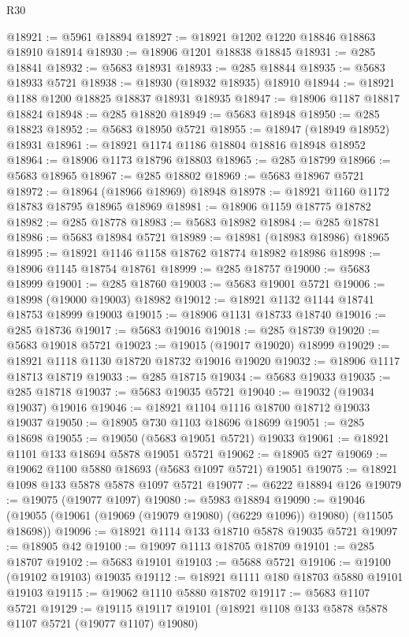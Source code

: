 \begin{lexlean}{R30}
\begin{coremodule}
@18921 := @5961 @18894
@18927 := @18921 @1202 @1220 @18846 @18863 @18910 @18914
@18930 := @18906 @1201 @18838 @18845
@18931 := @285 @18841
@18932 := @5683 @18931
@18933 := @285 @18844
@18935 := @5683 @18933 @5721
@18938 := @18930 (@18932 @18935) @18910
@18944 := @18921 @1188 @1200 @18825 @18837 @18931 @18935
@18947 := @18906 @1187 @18817 @18824
@18948 := @285 @18820
@18949 := @5683 @18948
@18950 := @285 @18823
@18952 := @5683 @18950 @5721
@18955 := @18947 (@18949 @18952) @18931
@18961 := @18921 @1174 @1186 @18804 @18816 @18948 @18952
@18964 := @18906 @1173 @18796 @18803
@18965 := @285 @18799
@18966 := @5683 @18965
@18967 := @285 @18802
@18969 := @5683 @18967 @5721
@18972 := @18964 (@18966 @18969) @18948
@18978 := @18921 @1160 @1172 @18783 @18795 @18965 @18969
@18981 := @18906 @1159 @18775 @18782
@18982 := @285 @18778
@18983 := @5683 @18982
@18984 := @285 @18781
@18986 := @5683 @18984 @5721
@18989 := @18981 (@18983 @18986) @18965
@18995 := @18921 @1146 @1158 @18762 @18774 @18982 @18986
@18998 := @18906 @1145 @18754 @18761
@18999 := @285 @18757
@19000 := @5683 @18999
@19001 := @285 @18760
@19003 := @5683 @19001 @5721
@19006 := @18998 (@19000 @19003) @18982
@19012 := @18921 @1132 @1144 @18741 @18753 @18999 @19003
@19015 := @18906 @1131 @18733 @18740
@19016 := @285 @18736
@19017 := @5683 @19016
@19018 := @285 @18739
@19020 := @5683 @19018 @5721
@19023 := @19015 (@19017 @19020) @18999
@19029 := @18921 @1118 @1130 @18720 @18732 @19016 @19020
@19032 := @18906 @1117 @18713 @18719
@19033 := @285 @18715
@19034 := @5683 @19033
@19035 := @285 @18718
@19037 := @5683 @19035 @5721
@19040 := @19032 (@19034 @19037) @19016
@19046 := @18921 @1104 @1116 @18700 @18712 @19033 @19037
@19050 := @18905 @730 @1103 @18696 @18699
@19051 := @285 @18698
@19055 := @19050 (@5683 @19051 @5721) @19033
@19061 := @18921 @1101 @133 @18694 @5878 @19051 @5721
@19062 := @18905 @27
@19069 := @19062 @1100 @5880 @18693 (@5683 @1097 @5721) @19051
@19075 := @18921 @1098 @133 @5878 @5878 @1097 @5721
@19077 := @6222 @18894 @126
@19079 := @19075 (@19077 @1097)
@19080 := @5983 @18894
@19090 := @19046 (@19055 (@19061 (@19069 (@19079 @19080) (@6229 @1096)) @19080) (@11505 @18698))
@19096 := @18921 @1114 @133 @18710 @5878 @19035 @5721
@19097 := @18905 @42
@19100 := @19097 @1113 @18705 @18709
@19101 := @285 @18707
@19102 := @5683 @19101
@19103 := @5688 @5721
@19106 := @19100 (@19102 @19103) @19035
@19112 := @18921 @1111 @180 @18703 @5880 @19101 @19103
@19115 := @19062 @1110 @5880 @18702
@19117 := @5683 @1107 @5721
@19129 := @19115 @19117 @19101 (@18921 @1108 @133 @5878 @5878 @1107 @5721 (@19077 @1107) @19080)

\end{coremodule}
\end{lexlean}
